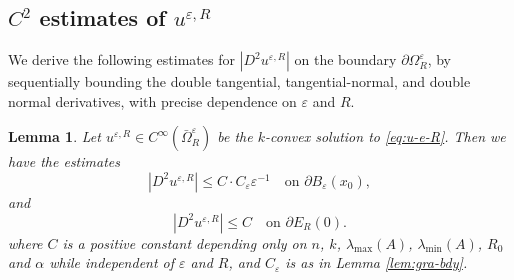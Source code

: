 \documentclass[reqno]{amsart}
\newtheorem{lemma}[theorem]{Lemma}
\theoremstyle{remark}
\theoremstyle{definition}
\numberwithin{equation}{section}
\begin{document}
\subsection{$C^2$ estimates of $u^{\varepsilon,R}$} We derive the following estimates for $|D^2u^{\varepsilon,R}|$ on the boundary $\partial\Omega_R^\varepsilon$, by sequentially bounding the double tangential, tangential-normal, and double normal derivatives, with precise dependence on $\varepsilon$ and $R$.
\begin{lemma}\label{lem:C2-est}
	Let $u^{\varepsilon,R}\in C^\infty(\bar{\Omega}_R^\varepsilon)$ be the $k$-convex solution to \eqref{eq:u-e-R}. Then we have the estimates 
\begin{equation*}
	|D^2u^{\varepsilon,R}|\leq C\cdot C_\varepsilon \varepsilon^{-1}\quad\text{on }\partial B_\varepsilon(x_0),
\end{equation*}
and 
\begin{equation*}
	|D^2u^{\varepsilon,R}|\leq C\quad\text{on }\partial E _R(0).
\end{equation*}
	where $C$ is a positive constant depending only on $n$, $k$, $\lambda_{\mathrm{max}}(A)$, $\lambda_{\mathrm{min}}(A)$, $R_0$ and $\alpha$ while independent of $\varepsilon$ and $R$, and $C_\varepsilon$ is as in Lemma \ref{lem:gra-bdy}.
\end{lemma}
\end{document}
